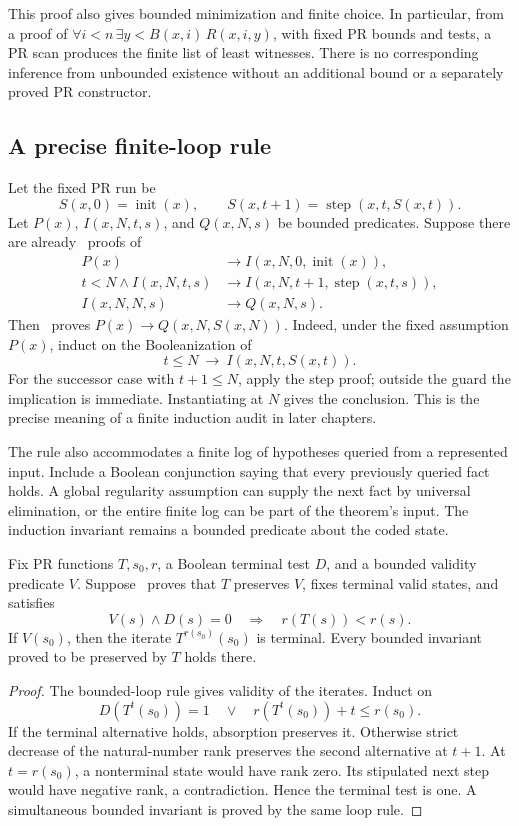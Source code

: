 This proof also gives bounded minimization and finite choice. In particular,
from a proof of
\(\forall i<n\,\exists y<B(x,i)\,R(x,i,y)\), with fixed PR bounds and
tests, a PR scan produces the finite list of least witnesses. There is no
corresponding inference from unbounded existence without an additional
bound or a separately proved PR constructor.

\subsection{A precise finite-loop rule}

Let the fixed PR run be
\[
 S(x,0)=\operatorname{init}(x),\qquad
 S(x,t+1)=\operatorname{step}(x,t,S(x,t)).
\]
Let \(P(x)\), \(I(x,N,t,s)\), and \(Q(x,N,s)\) be bounded predicates.
Suppose there are already \ipra\ proofs of
\begin{align*}
 P(x)&\to I(x,N,0,\operatorname{init}(x)),\\
 t<N\land I(x,N,t,s)&\to
 I(x,N,t+1,\operatorname{step}(x,t,s)),\\
 I(x,N,N,s)&\to Q(x,N,s).
\end{align*}
Then \ipra\ proves \(P(x)\to Q(x,N,S(x,N))\). Indeed, under the
fixed assumption \(P(x)\), induct on the Booleanization of
\[
              t\le N\ \longrightarrow\ I(x,N,t,S(x,t)).
\]
For the successor case with \(t+1\le N\), apply the step proof; outside
the guard the implication is immediate. Instantiating at \(N\) gives
the conclusion. This is the precise meaning of a finite induction audit
in later chapters.

The rule also accommodates a finite log of hypotheses queried from a
represented input. Include a Boolean conjunction saying that every
previously queried fact holds. A global regularity assumption can supply
the next fact by universal elimination, or the entire finite log can be
part of the theorem's input. The induction invariant remains a bounded
predicate about the coded state.

\begin{theorem}
\label{thm:rank}
Fix PR functions \(T,s_0,r\), a Boolean terminal test \(D\), and a
bounded validity predicate \(V\). Suppose \ipra\ proves that \(T\)
preserves \(V\), fixes terminal valid states, and satisfies
\[
 V(s)\land D(s)=0\quad\Longrightarrow\quad r(T(s))<r(s).
\]
If \(V(s_0)\), then the iterate \(T^{r(s_0)}(s_0)\) is terminal.
Every bounded invariant proved to be preserved by \(T\) holds there.
\end{theorem}
\begin{proof}
The bounded-loop rule gives validity of the iterates. Induct on
\[
 D(T^t(s_0))=1\quad\lor\quad r(T^t(s_0))+t\le r(s_0).
\]
If the terminal alternative holds, absorption preserves it. Otherwise
strict decrease of the natural-number rank preserves the second
alternative at \(t+1\). At \(t=r(s_0)\), a nonterminal state would
have rank zero. Its stipulated next step would have negative rank, a
contradiction. Hence the terminal test is one. A simultaneous bounded
invariant is proved by the same loop rule.
\end{proof}

